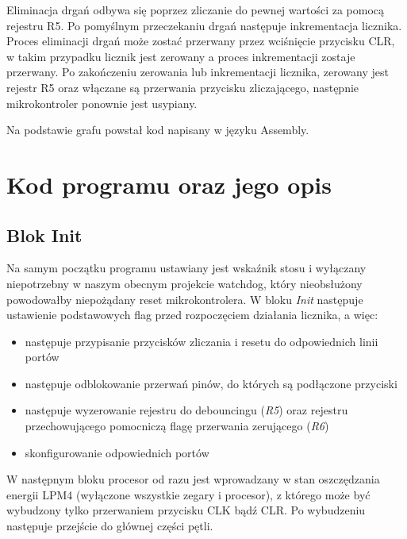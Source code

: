 \documentclass[fleqn]{article}
\begin{document}
Eliminacja drgań odbywa się poprzez zliczanie do pewnej wartości za pomocą rejestru R5. Po pomyślnym przeczekaniu drgań następuje inkrementacja licznika. Proces eliminacji drgań może zostać przerwany przez wciśnięcie przycisku CLR, w takim przypadku licznik jest zerowany a proces inkrementacji zostaje przerwany. Po zakończeniu zerowania lub inkrementacji licznika, zerowany jest rejestr R5 oraz włączane są przerwania przycisku zliczającego, następnie mikrokontroler ponownie jest usypiany.

Na podstawie grafu powstał kod napisany w języku Assembly.



\section{Kod programu oraz jego opis}

\subsection{Blok Init}
		Na samym początku programu ustawiany jest wskaźnik stosu i wyłączany niepotrzebny w naszym obecnym projekcie watchdog, który nieobsłużony powodowałby niepożądany reset mikrokontrolera.
		W bloku \textit{Init} następuje ustawienie podstawowych flag przed rozpoczęciem działania licznika, a więc:
		\begin{itemize}
			\item następuje przypisanie przycisków zliczania i resetu do odpowiednich linii portów
			\item następuje odblokowanie przerwań pinów, do których są podłączone przyciski
			\item następuje wyzerowanie rejestru do debouncingu (\textit{R5}) oraz rejestru przechowującego pomocniczą flagę przerwania zerującego (\textit{R6})
			\item skonfigurowanie odpowiednich portów
		\end{itemize}

		W następnym bloku procesor od razu jest wprowadzany w stan oszczędzania energii LPM4 (wyłączone wszystkie zegary i procesor), z którego może być wybudzony tylko przerwaniem przycisku CLK bądź CLR. Po wybudzeniu następuje przejście do głównej części pętli.
\end{document}
